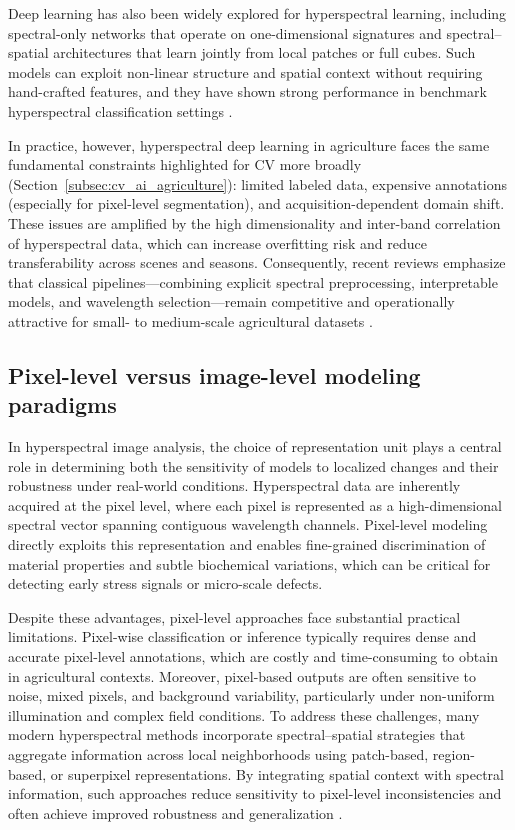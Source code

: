 \noindent
Deep learning has also been widely explored for hyperspectral learning, including spectral-only networks that operate on one-dimensional signatures and spectral--spatial architectures that learn jointly from local patches or full cubes. Such models can exploit non-linear structure and spatial context without requiring hand-crafted features, and they have shown strong performance in benchmark hyperspectral classification settings \cite{Chen2024MutationHSI}.

\medskip
\noindent
In practice, however, hyperspectral deep learning in agriculture faces the same fundamental constraints highlighted for CV more broadly (Section~\ref{subsec:cv_ai_agriculture}): limited labeled data, expensive annotations (especially for pixel-level segmentation), and acquisition-dependent domain shift. These issues are amplified by the high dimensionality and inter-band correlation of hyperspectral data, which can increase overfitting risk and reduce transferability across scenes and seasons. Consequently, recent reviews emphasize that classical pipelines---combining explicit spectral preprocessing, interpretable models, and wavelength selection---remain competitive and operationally attractive for small- to medium-scale agricultural datasets \cite{RAM2024109037, su16146064, ATTRI2023102217}.


\subsection{Pixel-level versus image-level modeling paradigms}

\noindent

In hyperspectral image analysis, the choice of representation unit plays a central role in determining both the sensitivity of models to localized changes and their robustness under real-world conditions. Hyperspectral data are inherently acquired at the pixel level, where each pixel is represented as a high-dimensional spectral vector spanning contiguous wavelength channels. Pixel-level modeling directly exploits this representation and enables fine-grained discrimination of material properties and subtle biochemical variations, which can be critical for detecting early stress signals or micro-scale defects.

\medskip
\noindent
Despite these advantages, pixel-level approaches face substantial practical limitations. Pixel-wise classification or inference typically requires dense and accurate pixel-level annotations, which are costly and time-consuming to obtain in agricultural contexts. Moreover, pixel-based outputs are often sensitive to noise, mixed pixels, and background variability, particularly under non-uniform illumination and complex field conditions. To address these challenges, many modern hyperspectral methods incorporate spectral--spatial strategies that aggregate information across local neighborhoods using patch-based, region-based, or superpixel representations. By integrating spatial context with spectral information, such approaches reduce sensitivity to pixel-level inconsistencies and often achieve improved robustness and generalization \cite{Chen2024MutationHSI}.


